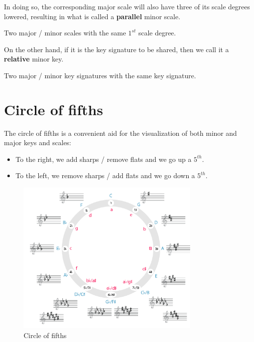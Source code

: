 In doing so, the corresponding major scale will also have three of its scale degrees lowered, resulting in what is called a \textbf{parallel} minor scale.

\begin{definition}
    Two major / minor scales with the same $1^{st}$ scale degree.
\end{definition}

On the other hand, if it is the key signature to be shared, then we call it a \textbf{relative} minor key.

\begin{definition}
    Two major / minor key signatures with the same key signature.
\end{definition}

\section{Circle of fifths}
The circle of fifths is a convenient aid for the visualization of both minor and major keys and scales:
\begin{itemize}
    \item To the right, we add sharps / remove flats and we go up a $5^{th}$.
    \item To the left, we remove sharps / add flats and we go down a $5^{th}$.
\end{itemize}

\begin{figure}
    \begin{center}
        \includegraphics[width=0.8\textwidth]{img/circle}
        \caption{Circle of fifths}
    \end{center}
\end{figure}

